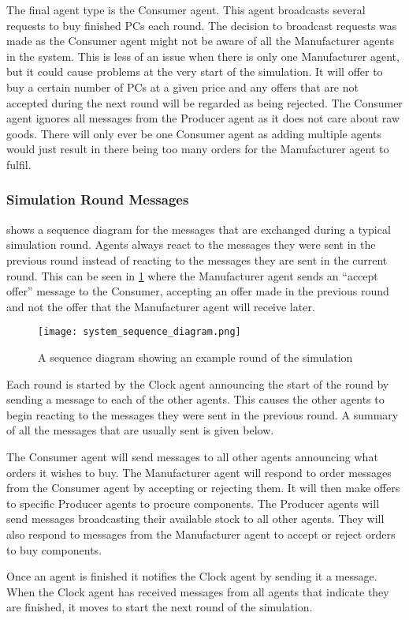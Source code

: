 The final agent type is the Consumer agent.
This agent broadcasts several requests to buy finished PCs each round.
The decision to broadcast requests was made as the Consumer agent might not be aware of all the Manufacturer agents in the system.
This is less of an issue when there is only one Manufacturer agent, but it could cause problems at the very start of the simulation.
It will offer to buy a certain number of PCs at a given price and any offers that are not accepted during the next round will be regarded as being rejected.
The Consumer agent ignores all messages from the Producer agent as it does not care about raw goods.
There will only ever be one Consumer agent as adding multiple agents would just result in there being too many orders for the Manufacturer agent to fulfil.

\subsubsection{Simulation Round Messages}

 shows a sequence diagram for the messages that are exchanged during a typical simulation round.
Agents always react to the messages they were sent in the previous round instead of reacting to the messages they are sent in the current round.
This can be seen in \cref{fig:system_sequence_diagram} where the Manufacturer agent sends an ``accept offer'' message to the Consumer, accepting an offer made in the previous round and not the offer that the Manufacturer agent will receive later.

\begin{figure}[ht]
    \centering
    \texttt{[image: system\_sequence\_diagram.png]}
    \caption{A sequence diagram showing an example round of the simulation}\label{fig:system_sequence_diagram}
\end{figure}

Each round is started by the Clock agent announcing the start of the round by sending a message to each of the other agents.
This causes the other agents to begin reacting to the messages they were sent in the previous round.
A summary of all the messages that are usually sent is given below.

The Consumer agent will send messages to all other agents announcing what orders it wishes to buy.
The Manufacturer agent will respond to order messages from the Consumer agent by accepting or rejecting them.
It will then make offers to specific Producer agents to procure components.
The Producer agents will send messages broadcasting their available stock to all other agents.
They will also respond to messages from the Manufacturer agent to accept or reject orders to buy components.

Once an agent is finished it notifies the Clock agent by sending it a message.
When the Clock agent has received messages from all agents that indicate they are finished, it moves to start the next round of the simulation.

